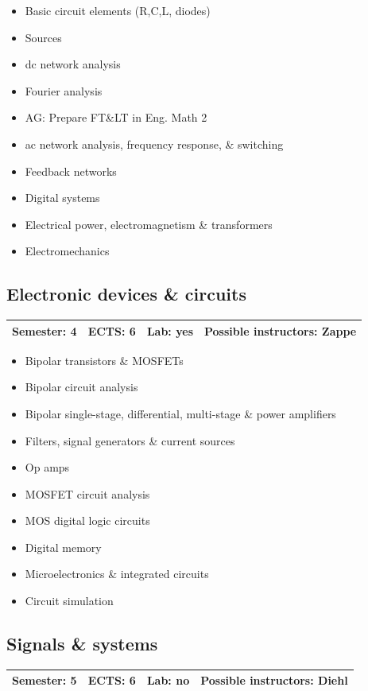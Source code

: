 \documentclass[12pt,twoside,fleqn,a4paper]{article}
\newcommand{\ag}[1]{{\color{blue}AG: #1}}  %
\begin{document}
\begin{itemize}
\setlength\itemsep{0cm}
\item Basic circuit elements (R,C,L, diodes)
\item Sources
\item dc network analysis
\item Fourier analysis
\item \ag{Prepare FT\&LT in Eng. Math 2}
\item ac network analysis, frequency response, \& switching
\item Feedback networks
\item Digital systems
\item Electrical power, electromagnetism \& transformers
\item Electromechanics
\end{itemize}


\subsection{Electronic devices \& circuits}
\begin{tabular}{llll} \hline
\textbf{Semester:} 4 & \textbf{ECTS:} 6 & \textbf{Lab:} yes & \textbf{Possible instructors:} Zappe\\
\hline
\end{tabular}

\begin{itemize}
\setlength\itemsep{0cm}
\item Bipolar transistors \& MOSFETs
\item Bipolar circuit analysis
\item Bipolar single-stage, differential, multi-stage \& power amplifiers
\item Filters, signal generators \& current sources
\item Op amps
\item MOSFET circuit analysis
\item MOS digital logic circuits
\item Digital memory
\item Microelectronics \& integrated circuits
\item Circuit simulation
\end{itemize}


\subsection{Signals \& systems}
\begin{tabular}{llll} \hline
\textbf{Semester:} 5 & \textbf{ECTS:} 6 & \textbf{Lab:} no & \textbf{Possible instructors:} Diehl\\
\hline
\end{tabular}
\end{document}
